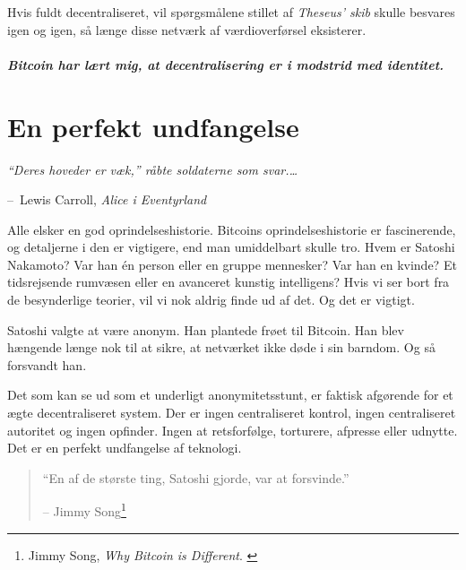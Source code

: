 \documentclass[paper=6in:9in,pagesize=pdftex,
               headinclude=on,footinclude=on,12pt]{scrbook}
\makeatletter
\newenvironment{chapquote}[2][4em]{\setlength{\@tempdima}{#1}%
   \def\chapquote@author{#2}%
   \parshape 1 \@tempdima \dimexpr\textwidth-2\@tempdima\relax%
   \itshape}{\par\normalfont\hfill--\ \chapquote@author\hspace*{\@tempdima}\par\bigskip}
\makeatother
\begin{document}
Hvis fuldt decentraliseret, vil spørgsmålene stillet af \textit{Theseus' skib} skulle besvares igen og igen, så længe disse netværk af værdioverførsel eksisterer.\paragraph{Bitcoin har lært mig, at decentralisering er i modstrid med identitet.}%
%
%
%
%

\chapter{En perfekt undfangelse}
\label{les:5}

\begin{chapquote}{Lewis Carroll, \textit{Alice i Eventyrland}} \enquote{Deres hoveder er væk,} råbte soldaterne som svar.\ldots
\end{chapquote}

Alle elsker en god oprindelseshistorie. Bitcoins oprindelseshistorie er fascinerende, og detaljerne i den er vigtigere, end man umiddelbart skulle tro. Hvem er Satoshi Nakamoto? Var han \'en person eller en gruppe mennesker? Var han en kvinde? Et tidsrejsende rumvæsen eller en avanceret kunstig intelligens? Hvis vi ser bort fra de besynderlige teorier, vil vi nok aldrig finde ud af det. Og det er vigtigt.

Satoshi valgte at være anonym. Han plantede frøet til Bitcoin. Han blev hængende længe nok til at sikre, at netværket ikke døde i sin barndom. Og så forsvandt han.

Det som kan se ud som et underligt anonymitetsstunt, er faktisk afgørende for et ægte decentraliseret system. Der er ingen centraliseret kontrol, ingen centraliseret autoritet og ingen opfinder. Ingen at retsforfølge, torturere, afpresse eller udnytte. Det er en perfekt undfangelse af teknologi.\begin{quotation}\begin{samepage} \enquote{En af de største ting, Satoshi gjorde, var at forsvinde.} \begin{flushright} -- Jimmy Song\footnote{Jimmy Song, \textit{Why Bitcoin is Different}. \cite{bitcoin-different}}
\end{flushright}\end{samepage}\end{quotation}
\end{document}
